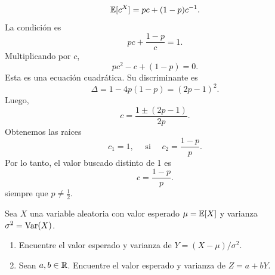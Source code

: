 \documentclass[12pt,a4paper]{article}
\begin{document}
\begin{solucion}
\begin{enumerate}
            \begin{equation*}
                \mathbb{E}[c^{X}]=pc+(1-p)c^{-1}.
            \end{equation*}
            La condición es
            \begin{equation*}
                pc+\frac{1-p}{c}=1.
            \end{equation*}
            Multiplicando por $c$,
            \begin{equation*}
                pc^{2}-c+(1-p)=0.
            \end{equation*}
            Esta es una ecuación cuadrática. Su discriminante es
            \begin{equation*}
                \Delta=1-4p(1-p)=(2p-1)^{2}.
            \end{equation*}
            Luego,
            \begin{equation*}
                c=\frac{1\pm(2p-1)}{2p}.
            \end{equation*}
            Obtenemos las raices
            \begin{equation*}
                c_{1}=1,\quad\text{ si }\quad c_{2}=\frac{1-p}{p}.
            \end{equation*}
            Por lo tanto, el valor buscado distinto de 1 es
            \begin{equation*}
                c=\frac{1-p}{p}.
            \end{equation*}
            siempre que $p\neq\frac{1}{2}$.
        \end{enumerate}
    \end{solucion}

    \begin{mdframed}[style=mdpinkbox,frametitle={Ejercicio 2}]
        Sea $X$ una variable aleatoria con valor esperado $\mu=\mathbb{E}[X]$ y varianza $\sigma^{2}=\operatorname{Var}(X)$.
        \begin{enumerate}
            \item[(a)] Encuentre el valor esperado y varianza de $Y=(X-\mu)/\sigma^{2}$.
            \item[(b)] Sean $a,b\in\mathbb{R}$. Encuentre el valor esperado y varianza de $Z=a+bY$.
        \end{enumerate}
    \end{mdframed}
\end{document}
